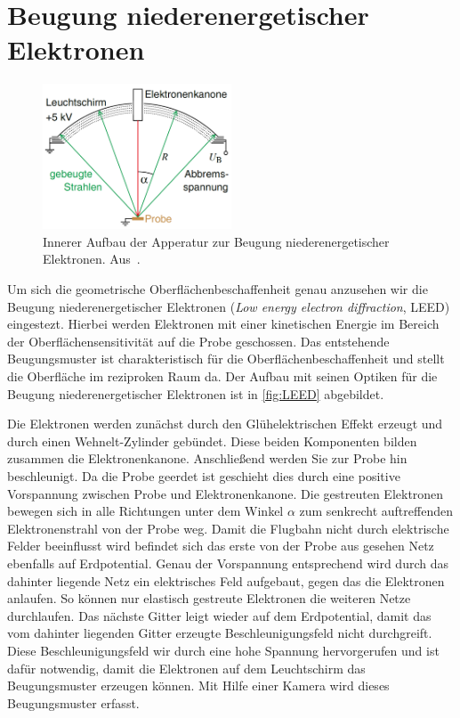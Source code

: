     \section{Beugung niederenergetischer Elektronen} \label{sec:LEED}
        \begin{figure}
            \centering
            \includegraphics[width=0.5\textwidth]{./content/LEED.PNG}
            \caption{Innerer Aufbau der Apperatur zur Beugung niederenergetischer Elektronen. Aus~\cite{Fauster}.}
            \label{fig:LEED}
        \end{figure}
        Um sich die geometrische Oberflächenbeschaffenheit genau anzusehen wir die Beugung niederenergetischer Elektronen (\textit{Low energy electron diffraction}, LEED) eingestezt.
        Hierbei werden Elektronen mit einer kinetischen Energie im Bereich der Oberflächensensitivität auf die Probe geschossen.
        Das entstehende Beugungsmuster ist charakteristisch für die Oberflächenbeschaffenheit und stellt die Oberfläche im reziproken Raum da.
        Der Aufbau mit seinen Optiken für die Beugung niederenergetischer Elektronen ist in \autoref{fig:LEED} abgebildet.
        
        Die Elektronen werden zunächst durch den Glühelektrischen Effekt erzeugt und durch einen Wehnelt-Zylinder gebündet.
        Diese beiden Komponenten bilden zusammen die Elektronenkanone.
        Anschließend werden Sie zur Probe hin beschleunigt.
        Da die Probe geerdet ist geschieht dies durch eine positive Vorspannung zwischen Probe und Elektronenkanone.
        Die gestreuten Elektronen bewegen sich in alle Richtungen unter dem Winkel $\alpha$ zum senkrecht auftreffenden Elektronenstrahl von der Probe weg.
        Damit die Flugbahn nicht durch elektrische Felder beeinflusst wird befindet sich das erste von der Probe aus gesehen Netz ebenfalls auf Erdpotential.
        Genau der Vorspannung entsprechend wird durch das dahinter liegende Netz  ein elektrisches Feld aufgebaut, gegen das die Elektronen anlaufen.
        So können nur elastisch gestreute Elektronen die weiteren Netze durchlaufen.
        Das nächste Gitter leigt wieder auf dem Erdpotential, damit das vom dahinter liegenden Gitter erzeugte Beschleunigungsfeld nicht durchgreift.
        Diese Beschleunigungsfeld wir durch eine hohe Spannung hervorgerufen und ist dafür notwendig, damit die Elektronen auf dem Leuchtschirm das Beugungsmuster erzeugen können.
        Mit Hilfe einer Kamera wird dieses Beugungsmuster erfasst.


